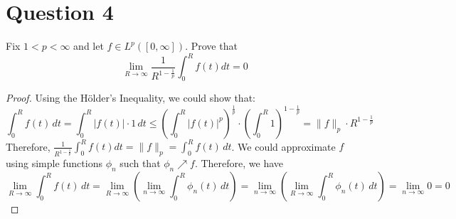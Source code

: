 \section{Question 4}

\begin{question}
    Fix $1<p<\infty$ and let $f \in L^p([0, \infty])$. Prove that
    $$
    \lim _{R \rightarrow \infty} \frac{1}{R^{1-\frac{1}{p}}} \int_0^R f(t) d t=0
    $$
\end{question}

\begin{answer}
    \begin{proof}
        Using the Hölder's Inequality, we could show that:
        \begin{equation}
            \int_0^R f(t) \,dt = \int_0^R \lvert f(t) \rvert \cdot 1 \,dt \leq \left(\int_0^R \lvert f(t) \rvert^p \right)^{\frac{1}{p}}\cdot \left(\int_0^R 1\right)^{1-\frac{1}{p}} = \lVert f \rVert_p \cdot R^{1-\frac{1}{p}}
        \end{equation}
        Therefore, $\frac{1}{R^{1-\frac{1}{p}}} \int_0^R f(t) d t = \lVert f \rVert_p = \int_0^R f(t) \,dt$. We could approximate $f$ using simple functions $\phi_n$ such that $\phi_n \nearrow f$. Therefore, we have
        \begin{equation}
            \lim _{R \rightarrow \infty} \int_0^R f(t) \,dt = \lim_{R \to \infty} \left(\lim_{n \to \infty} \int_0^R \phi_n(t) \,dt\right) = \lim_{n \to \infty} \left(\lim_{R \to \infty} \int_0^R \phi_n(t) \,dt\right) = \lim_{n \to \infty} 0 = 0
        \end{equation}
    \end{proof}
\end{answer}